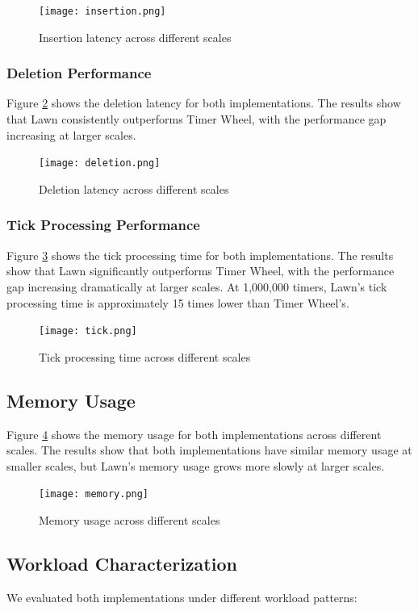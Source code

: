 \documentclass[conference]{IEEEtran}
\begin{document}
\begin{figure}[ht]
	\centering
	\texttt{[image: insertion.png]}
	\caption{Insertion latency across different scales}
	\label{fig:insertion}
\end{figure}

\subsubsection{Deletion Performance}
Figure \ref{fig:deletion} shows the deletion latency for both implementations. The results show that Lawn consistently outperforms Timer Wheel, with the performance gap increasing at larger scales.

\begin{figure}[ht]
	\centering
	\texttt{[image: deletion.png]}
	\caption{Deletion latency across different scales}
	\label{fig:deletion}
\end{figure}

\subsubsection{Tick Processing Performance}
Figure \ref{fig:tick} shows the tick processing time for both implementations. The results show that Lawn significantly outperforms Timer Wheel, with the performance gap increasing dramatically at larger scales. At 1,000,000 timers, Lawn's tick processing time is approximately 15 times lower than Timer Wheel's.

\begin{figure}[ht]
	\centering
	\texttt{[image: tick.png]}
	\caption{Tick processing time across different scales}
	\label{fig:tick}
\end{figure}

\subsection{Memory Usage}
Figure \ref{fig:memory} shows the memory usage for both implementations across different scales. The results show that both implementations have similar memory usage at smaller scales, but Lawn's memory usage grows more slowly at larger scales.

\begin{figure}[ht]
	\centering
	\texttt{[image: memory.png]}
	\caption{Memory usage across different scales}
	\label{fig:memory}
\end{figure}

\subsection{Workload Characterization}
We evaluated both implementations under different workload patterns:
\end{document}
